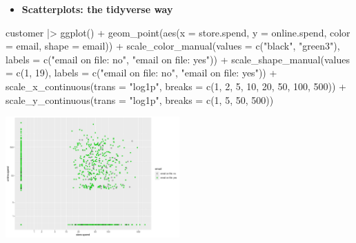 \documentclass[
  ignorenonframetext,
]{beamer}
\newenvironment{Shaded}{\begin{snugshade}}{\end{snugshade}}
\newcommand{\AttributeTok}[1]{\textcolor[rgb]{0.40,0.45,0.13}{#1}}
\newcommand{\DecValTok}[1]{\textcolor[rgb]{0.68,0.00,0.00}{#1}}
\newcommand{\FunctionTok}[1]{\textcolor[rgb]{0.28,0.35,0.67}{#1}}
\newcommand{\NormalTok}[1]{\textcolor[rgb]{0.00,0.23,0.31}{#1}}
\newcommand{\SpecialCharTok}[1]{\textcolor[rgb]{0.37,0.37,0.37}{#1}}
\newcommand{\StringTok}[1]{\textcolor[rgb]{0.13,0.47,0.30}{#1}}
\providecommand{\tightlist}{%
  \setlength{\itemsep}{0pt}\setlength{\parskip}{0pt}}\usepackage{longtable,booktabs,array}
\begin{document}
\begin{frame}[fragile]{}
\label{section-15}
\begin{itemize}
\tightlist
\item
  \textbf{Scatterplots: the tidyverse way}
\end{itemize}

\tiny

\begin{Shaded}
\begin{Highlighting}[]
\NormalTok{customer }\SpecialCharTok{|\textgreater{}} \FunctionTok{ggplot}\NormalTok{() }\SpecialCharTok{+}
  \FunctionTok{geom\_point}\NormalTok{(}\FunctionTok{aes}\NormalTok{(}\AttributeTok{x =}\NormalTok{ store.spend, }\AttributeTok{y =}\NormalTok{ online.spend, }\AttributeTok{color =}\NormalTok{ email, }\AttributeTok{shape =}\NormalTok{ email)) }\SpecialCharTok{+}
  \FunctionTok{scale\_color\_manual}\NormalTok{(}\AttributeTok{values =} \FunctionTok{c}\NormalTok{(}\StringTok{"black"}\NormalTok{, }\StringTok{"green3"}\NormalTok{), }\AttributeTok{labels =} \FunctionTok{c}\NormalTok{(}\StringTok{"email on file: no"}\NormalTok{, }\StringTok{"email on file: yes"}\NormalTok{)) }\SpecialCharTok{+}
  \FunctionTok{scale\_shape\_manual}\NormalTok{(}\AttributeTok{values =} \FunctionTok{c}\NormalTok{(}\DecValTok{1}\NormalTok{, }\DecValTok{19}\NormalTok{), }\AttributeTok{labels =} \FunctionTok{c}\NormalTok{(}\StringTok{"email on file: no"}\NormalTok{, }\StringTok{"email on file: yes"}\NormalTok{)) }\SpecialCharTok{+}
  \FunctionTok{scale\_x\_continuous}\NormalTok{(}\AttributeTok{trans =} \StringTok{"log1p"}\NormalTok{, }\AttributeTok{breaks =} \FunctionTok{c}\NormalTok{(}\DecValTok{1}\NormalTok{, }\DecValTok{2}\NormalTok{, }\DecValTok{5}\NormalTok{, }\DecValTok{10}\NormalTok{, }\DecValTok{20}\NormalTok{, }\DecValTok{50}\NormalTok{, }\DecValTok{100}\NormalTok{, }\DecValTok{500}\NormalTok{)) }\SpecialCharTok{+} 
  \FunctionTok{scale\_y\_continuous}\NormalTok{(}\AttributeTok{trans =} \StringTok{"log1p"}\NormalTok{, }\AttributeTok{breaks =} \FunctionTok{c}\NormalTok{(}\DecValTok{1}\NormalTok{, }\DecValTok{5}\NormalTok{, }\DecValTok{50}\NormalTok{, }\DecValTok{500}\NormalTok{))}
\end{Highlighting}
\end{Shaded}

\begin{center}
\includegraphics[width=0.5\textwidth,height=\textheight]{004_relationships_between_continuous_variables_files/figure-beamer/unnamed-chunk-13-1.pdf}
\end{center}
\end{frame}
\end{document}
